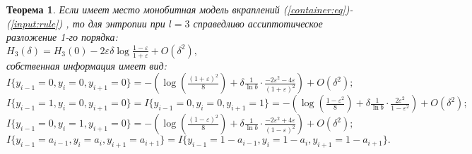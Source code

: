 \documentclass[a4paper,12pt]{article}
\theoremstyle{plain}
\newtheorem{theorem}{Теорема}[section]
\begin{document}
	\begin{theorem}
		Если имеет место монобитная модель вкраплений (\ref{container:eq})-(\ref{input:rule}) , то для энтропии при $l=3$ справедливо ассиптотическое разложение 1-го порядка:\\
		$H_3(\delta)=H_3(0)- 2\varepsilon\delta \log\frac{1-\varepsilon}{1+\varepsilon}+ O(\delta^2),$\\
		собственная информация имеет вид:\\
		$I\{y_{i-1} = 0, y_i = 0, y_{i+1} = 0\}=-( \log(\frac{(1+\varepsilon)^2}{8})+\delta\frac{1}{\ln b}\cdot\frac{-2\varepsilon^2-4\varepsilon}{(1+\varepsilon)^2}) + O(\delta^2);$ \\
			$I\{y_{i-1} = 1, y_i = 0, y_{i+1} = 0\}= I\{y_{i-1} = 0, y_i = 0, y_{i+1} = 1\}= -(\log(\frac{1-\varepsilon^2}{8})+\delta\frac{1}{\ln b}\cdot\frac{2\varepsilon^2}{1-\varepsilon^2}) + O(\delta^2);$\\
				$I\{y_{i-1} = 0, y_i = 1, y_{i+1} = 0\}= -(\log(\frac{(1-\varepsilon)^2}{8})+\delta\frac{1}{\ln b}\cdot\frac{-2\varepsilon^2+4\varepsilon}{(1-\varepsilon)^2}) + O(\delta^2);$\\
				$I\{y_{i-1} = a_{i-1}, y_i = a_i, y_{i+1} = a_{i+1}\}=I\{y_{i-1} = 1-a_{i-1}, y_i = 1-a_i, y_{i+1} = 1-a_{i+1}\}.$\\
				
	\end{theorem}
\end{document}
